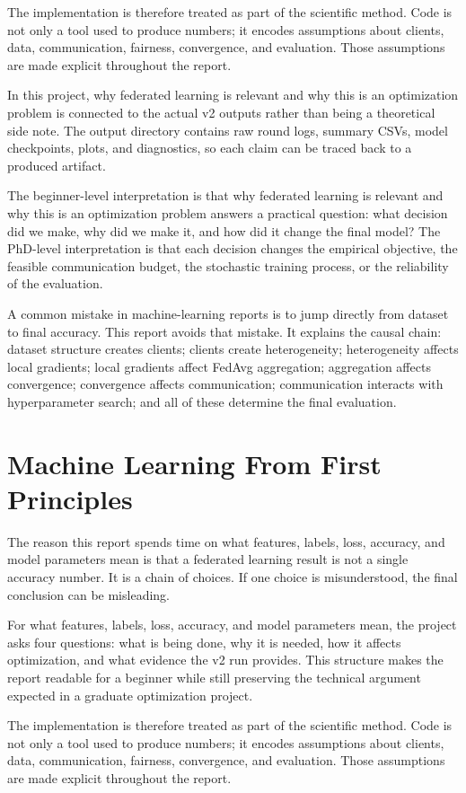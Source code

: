 \documentclass[11pt]{report}
\begin{document}
The implementation is therefore treated as part of the scientific method. Code is not only a tool
used to produce numbers; it encodes assumptions about clients, data, communication, fairness,
convergence, and evaluation. Those assumptions are made explicit throughout the report.

In this project, why federated learning is relevant and why this is an optimization problem is
connected to the actual v2 outputs rather than being a theoretical side note. The output directory
contains raw round logs, summary CSVs, model checkpoints, plots, and diagnostics, so each claim can
be traced back to a produced artifact.

The beginner-level interpretation is that why federated learning is relevant and why this is an
optimization problem answers a practical question: what decision did we make, why did we make it,
and how did it change the final model? The PhD-level interpretation is that each decision changes
the empirical objective, the feasible communication budget, the stochastic training process, or the
reliability of the evaluation.

A common mistake in machine-learning reports is to jump directly from dataset to final accuracy.
This report avoids that mistake. It explains the causal chain: dataset structure creates clients;
clients create heterogeneity; heterogeneity affects local gradients; local gradients affect FedAvg
aggregation; aggregation affects convergence; convergence affects communication; communication
interacts with hyperparameter search; and all of these determine the final evaluation.

\chapter{Machine Learning From First Principles}
The reason this report spends time on what features, labels, loss, accuracy, and model parameters
mean is that a federated learning result is not a single accuracy number. It is a chain of choices.
If one choice is misunderstood, the final conclusion can be misleading.

For what features, labels, loss, accuracy, and model parameters mean, the project asks four
questions: what is being done, why it is needed, how it affects optimization, and what evidence the
v2 run provides. This structure makes the report readable for a beginner while still preserving the
technical argument expected in a graduate optimization project.

The implementation is therefore treated as part of the scientific method. Code is not only a tool
used to produce numbers; it encodes assumptions about clients, data, communication, fairness,
convergence, and evaluation. Those assumptions are made explicit throughout the report.
\end{document}
